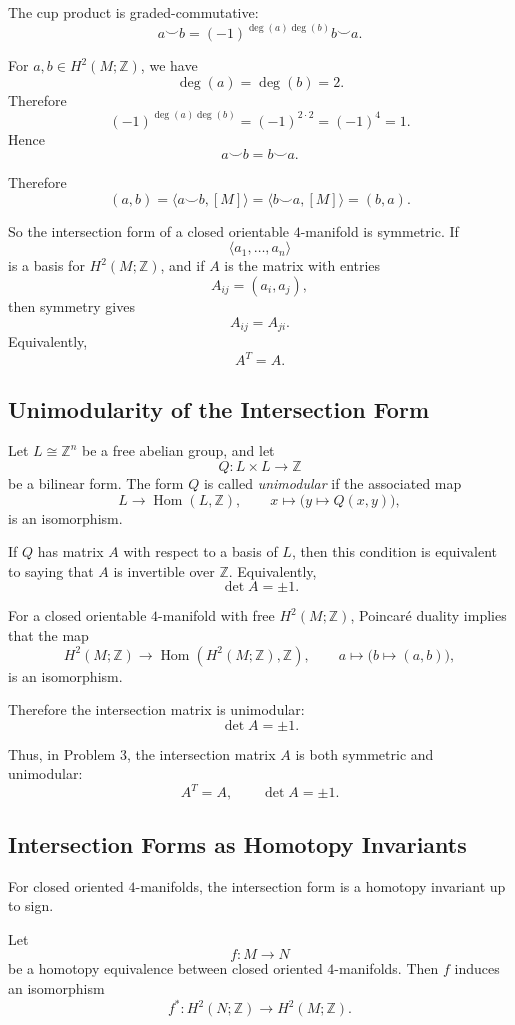 \documentclass[12pt,a4paper]{article}
\theoremstyle{notespace}
\begin{document}
The cup product is graded-commutative:
\[
a\smile b=(-1)^{\deg(a)\deg(b)}b\smile a.
\]

For \(a,b\in H^2(M;\mathbb Z)\), we have
\[
\deg(a)=\deg(b)=2.
\]
Therefore
\[
(-1)^{\deg(a)\deg(b)}
=
(-1)^{2\cdot 2}
=
(-1)^4
=
1.
\]
Hence
\[
a\smile b=b\smile a.
\]

Therefore
\[
(a,b)
=
\langle a\smile b,[M]\rangle
=
\langle b\smile a,[M]\rangle
=
(b,a).
\]

So the intersection form of a closed orientable \(4\)-manifold is symmetric. If
\[
\langle a_1,\ldots,a_n\rangle
\]
is a basis for \(H^2(M;\mathbb Z)\), and if \(A\) is the matrix with entries
\[
A_{ij}=(a_i,a_j),
\]
then symmetry gives
\[
A_{ij}=A_{ji}.
\]
Equivalently,
\[
A^T=A.
\]

\subsection{Unimodularity of the Intersection Form}

Let \(L\cong \mathbb Z^n\) be a free abelian group, and let
\[
Q:L\times L\to \mathbb Z
\]
be a bilinear form. The form \(Q\) is called \emph{unimodular} if the associated
map
\[
L\longrightarrow \operatorname{Hom}(L,\mathbb Z),
\qquad
x\longmapsto \bigl(y\mapsto Q(x,y)\bigr),
\]
is an isomorphism.

If \(Q\) has matrix \(A\) with respect to a basis of \(L\), then this condition is
equivalent to saying that \(A\) is invertible over \(\mathbb Z\). Equivalently,
\[
\det A=\pm 1.
\]

For a closed orientable \(4\)-manifold with free \(H^2(M;\mathbb Z)\), Poincaré
duality implies that the map
\[
H^2(M;\mathbb Z)
\longrightarrow
\operatorname{Hom}(H^2(M;\mathbb Z),\mathbb Z),
\qquad
a\longmapsto \bigl(b\mapsto (a,b)\bigr),
\]
is an isomorphism.

Therefore the intersection matrix is unimodular:
\[
\det A=\pm 1.
\]

Thus, in Problem 3, the intersection matrix \(A\) is both symmetric and
unimodular:
\[
A^T=A,
\qquad
\det A=\pm 1.
\]

\subsection{Intersection Forms as Homotopy Invariants}

For closed oriented \(4\)-manifolds, the intersection form is a homotopy
invariant up to sign.

Let
\[
f:M\to N
\]
be a homotopy equivalence between closed oriented \(4\)-manifolds. Then \(f\)
induces an isomorphism
\[
f^*:H^2(N;\mathbb Z)\to H^2(M;\mathbb Z).
\]
\end{document}
